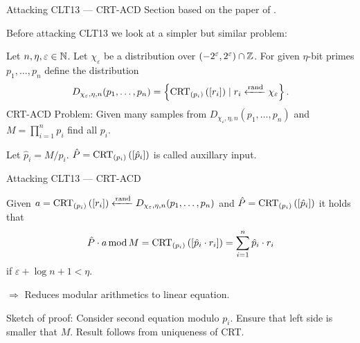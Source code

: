 \documentclass[english]{beamer}
\begin{document}
    \begin{frame}{Attacking CLT13 --- CRT-ACD}
        Section based on the paper of .

        Before attacking CLT13 we look at a simpler but similar problem:
        \begin{definition}
            Let $n, \eta, \varepsilon \in \mathbb{N}$. Let $\chi_\varepsilon$ be a distribution over $(-2^\varepsilon, 2^\varepsilon) \cap \mathbb{Z}$. For given $\eta$-bit primes $p_1, \dots, p_n$ define the distribution
            \begin{equation*}
                D_{\chi_\varepsilon, \eta, n}(p_1, \dots, p_n) = \left\lbrace \operatorname{CRT}_{(p_{i})}\left(\left[r_i\right]\right) \mid r_i \xleftarrow{\mathrm{rand}} \chi_\varepsilon \right\rbrace.
            \end{equation*}
            CRT-ACD Problem: Given many samples from $D_{\chi_\varepsilon, \eta, n}(p_1, \dots, p_n)$ and $M = \prod_{i=1}^n p_i$ find all $p_i$.
        \end{definition}
        \pause

        Let $\hat{p}_i = M / p_i$. $\hat{P} = \operatorname{CRT}_{(p_{i})}\left(\left[\hat{p}_i\right]\right)$ is called auxillary input.
    \end{frame}
    \begin{frame}{Attacking CLT13 --- CRT-ACD}
        \begin{lemma}
            Given $a = \operatorname{CRT}_{(p_{i})}\left(\left[r_i\right]\right) \xleftarrow{\mathrm{rand}} D_{\chi_\varepsilon, \eta, n}(p_1, \dots, p_n)$ and $\hat{P} = \operatorname{CRT}_{(p_{i})}\left(\left[\hat{p}_i\right]\right)$ it holds that
            \begin{equation*}
                \hat{P} \cdot a \operatorname{mod} M = \operatorname{CRT}_{(p_{i})}\left(\left[\hat{p}_i \cdot r_i\right]\right) = \sum_{i=1}^n \hat{p}_i \cdot r_i
            \end{equation*}
            if $\varepsilon + \log n + 1 < \eta$.
        \end{lemma}
        \pause

        $\Rightarrow$ Reduces modular arithmetics to linear equation.

        \pause
        Sketch of proof: Consider second equation modulo $p_i$. Ensure that left side is smaller that $M$. Result follows from uniqueness of CRT.
    \end{frame}
\end{document}
